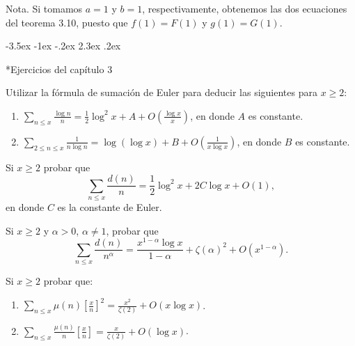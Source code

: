 \documentclass[12pt,a4paper]{book}
\makeatletter
\renewcommand\section{\@startsection{section}{1}{\z@}%
  {-3.5ex \@plus -1ex \@minus -.2ex}%
  {2.3ex \@plus .2ex}%
  {\normalfont\Large\bfseries\raggedright}}
\makeatother
\begin{document}
    Nota. Si tomamos $a=1$ y $b=1$, respectivamente, obtenemos las dos ecuaciones del
    teorema 3.10, puesto que $f(1)=F(1)$ y $g(1)=G(1)$.

    \section*{Ejercicios del capítulo 3}

    \begin{ejercicio}
        Utilizar la fórmula de sumación de Euler para deducir las siguientes para
        $x\geq2$:
        \begin{enumerate}
            \item[(a)] $\displaystyle\sum_{n\leq x}\frac{\log n}{n}=\frac{1}{2}\log^{2}x+A
            +O\left(\frac{\log x}{x}\right)$, en donde $A$ es constante.
            \item[(b)] $\displaystyle\sum_{2\leq n\leq x}\frac{1}{n\log n}=\log(\log x)+B
            +O\left(\frac{1}{x\log x}\right)$, en donde $B$ es constante.
        \end{enumerate}
    \end{ejercicio}

    \begin{ejercicio}
        Si $x\geq2$ probar que
        \begin{equation*}
            \sum_{n\leq x}\frac{d(n)}{n}=\frac{1}{2}\log^{2}x+2C\log x+O(1),
        \end{equation*}
        en donde $C$ es la constante de Euler.
    \end{ejercicio}

    \begin{ejercicio}
        Si $x\geq2$ y $\alpha>0$, $\alpha\neq1$, probar que
        \begin{equation*}
            \sum_{n\leq x}\frac{d(n)}{n^{\alpha}}=\frac{x^{1-\alpha}\log x}{1-\alpha}
            +\zeta(\alpha)^{2}+O(x^{1-\alpha}).
        \end{equation*}
    \end{ejercicio}

    \begin{ejercicio}
        Si $x\geq2$ probar que:
        \begin{enumerate}
            \item[(a)] $\displaystyle\sum_{n\leq x}\mu(n)\left[\frac{x}{n}\right]^{2}
            =\frac{x^{2}}{\zeta(2)}+O(x\log x)$.
            \item[(b)] $\displaystyle\sum_{n\leq x}\frac{\mu(n)}{n}\left[\frac{x}{n}\right]
            =\frac{x}{\zeta(2)}+O(\log x)$.
        \end{enumerate}
    \end{ejercicio}
\end{document}
